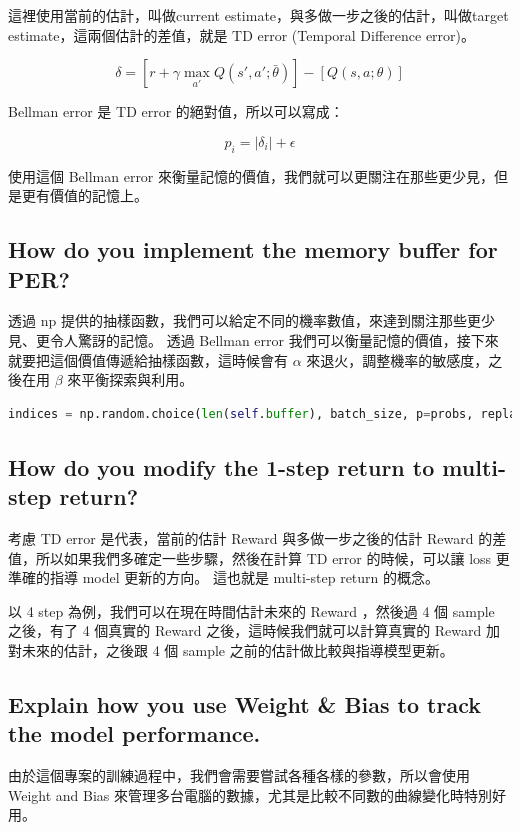 這裡使用當前的估計，叫做current estimate，與多做一步之後的估計，叫做target estimate，這兩個估計的差值，就是 TD error (Temporal Difference error)。

$$
\delta = [r + \gamma \max_{a'} Q(s', a'; \bar{\theta})] - [Q(s, a; \theta)]
$$

Bellman error 是 TD error 的絕對值，所以可以寫成：

$$
p_i = \left| \delta_i \right| + \epsilon
$$

使用這個 Bellman error 來衡量記憶的價值，我們就可以更關注在那些更少見，但是更有價值的記憶上。


\subsection{How do you implement the memory buffer for PER?}

透過 np 提供的抽樣函數，我們可以給定不同的機率數值，來達到關注那些更少見、更令人驚訝的記憶。
透過 Bellman error 我們可以衡量記憶的價值，接下來就要把這個價值傳遞給抽樣函數，這時候會有 $\alpha$ 來退火，調整機率的敏感度，之後在用 $\beta$ 來平衡探索與利用。

\begin{lstlisting}[language=Python, caption=使用 np.random.choice 來抽樣記憶。]
indices = np.random.choice(len(self.buffer), batch_size, p=probs, replace=True)
\end{lstlisting}

\subsection{How do you modify the 1-step return to multi-step return?}
考慮 TD error 是代表，當前的估計 Reward 與多做一步之後的估計 Reward 的差值，所以如果我們多確定一些步驟，然後在計算 TD error 的時候，可以讓 loss 更準確的指導 model 更新的方向。 這也就是 multi-step return 的概念。

以 4 step 為例，我們可以在現在時間估計未來的 Reward ，然後過 4 個 sample 之後，有了 4 個真實的 Reward 之後，這時候我們就可以計算真實的 Reward 加對未來的估計，之後跟 4 個 sample 之前的估計做比較與指導模型更新。

\subsection{Explain how you use Weight \& Bias to track the model performance.}
由於這個專案的訓練過程中，我們會需要嘗試各種各樣的參數，所以會使用 Weight and Bias 來管理多台電腦的數據，尤其是比較不同數的曲線變化時特別好用。

